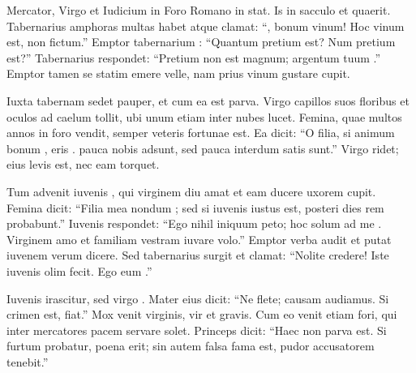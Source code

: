 \documentclass[12pt]{nextbook}
\begin{document}
\begin{readersection}{Mercator, Virgo et Iudicium in Foro Romano}
  in    stat. Is  in sacculo  et   quaerit. Tabernarius amphoras multas habet atque clamat: “, bonum vinum! Hoc vinum  est, non fictum.” Emptor tabernarium : “Quantum pretium est? Num pretium  est?” Tabernarius respondet: “Pretium non est magnum; argentum tuum .” Emptor tamen  se statim emere velle, nam prius vinum gustare cupit.

Iuxta tabernam sedet  pauper, et cum ea est  parva. Virgo capillos suos floribus  et oculos ad caelum tollit, ubi unum  etiam inter nubes lucet. Femina, quae multos annos in foro vendit, semper  veteris fortunae est. Ea dicit: “O filia, si animum bonum , eris .  pauca nobis adsunt, sed pauca interdum satis sunt.” Virgo ridet;  eius levis est, nec  eam torquet.

Tum advenit iuvenis , qui virginem diu amat et eam ducere uxorem cupit. Femina dicit: “Filia mea nondum ; sed si iuvenis iustus est, posteri dies rem probabunt.” Iuvenis respondet: “Ego nihil iniquum peto; hoc solum ad me . Virginem amo et familiam vestram iuvare volo.” Emptor verba audit et putat iuvenem verum dicere. Sed tabernarius  surgit et clamat: “Nolite credere! Iste iuvenis olim  fecit. Ego eum .”

Iuvenis irascitur, sed virgo . Mater eius dicit: “Ne flete; causam audiamus. Si crimen est,  fiat.” Mox venit  virginis, vir  et gravis. Cum eo venit etiam  fori, qui inter mercatores pacem servare solet. Princeps dicit: “Haec  non parva est. Si furtum probatur, poena erit; sin autem falsa fama est, pudor accusatorem tenebit.”


\end{readersection}
\end{document}

